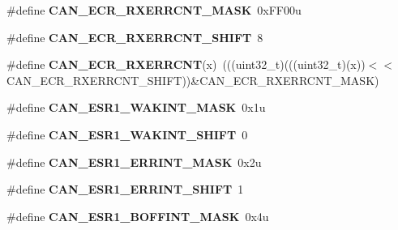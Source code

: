 \begin{DoxyCompactItemize}
\item 
\#define {\bfseries C\+A\+N\+\_\+\+E\+C\+R\+\_\+\+R\+X\+E\+R\+R\+C\+N\+T\+\_\+\+M\+A\+SK}~0x\+F\+F00u\hypertarget{group__CAN__Register__Masks_gaed0f3cf7cea69b12a5166e67ad58b98e}{}\label{group__CAN__Register__Masks_gaed0f3cf7cea69b12a5166e67ad58b98e}

\item 
\#define {\bfseries C\+A\+N\+\_\+\+E\+C\+R\+\_\+\+R\+X\+E\+R\+R\+C\+N\+T\+\_\+\+S\+H\+I\+FT}~8\hypertarget{group__CAN__Register__Masks_ga8211d5f10448105a549f3f4085813922}{}\label{group__CAN__Register__Masks_ga8211d5f10448105a549f3f4085813922}

\item 
\#define {\bfseries C\+A\+N\+\_\+\+E\+C\+R\+\_\+\+R\+X\+E\+R\+R\+C\+NT}(x)~(((uint32\+\_\+t)(((uint32\+\_\+t)(x))$<$$<$C\+A\+N\+\_\+\+E\+C\+R\+\_\+\+R\+X\+E\+R\+R\+C\+N\+T\+\_\+\+S\+H\+I\+FT))\&C\+A\+N\+\_\+\+E\+C\+R\+\_\+\+R\+X\+E\+R\+R\+C\+N\+T\+\_\+\+M\+A\+SK)\hypertarget{group__CAN__Register__Masks_gadbfcb3b6cf61b7a16a75f31d40cab98c}{}\label{group__CAN__Register__Masks_gadbfcb3b6cf61b7a16a75f31d40cab98c}

\item 
\#define {\bfseries C\+A\+N\+\_\+\+E\+S\+R1\+\_\+\+W\+A\+K\+I\+N\+T\+\_\+\+M\+A\+SK}~0x1u\hypertarget{group__CAN__Register__Masks_gaebf477ebf4b3df88922476e9ac121e06}{}\label{group__CAN__Register__Masks_gaebf477ebf4b3df88922476e9ac121e06}

\item 
\#define {\bfseries C\+A\+N\+\_\+\+E\+S\+R1\+\_\+\+W\+A\+K\+I\+N\+T\+\_\+\+S\+H\+I\+FT}~0\hypertarget{group__CAN__Register__Masks_ga146781b97b78d98eb3925860a96cf217}{}\label{group__CAN__Register__Masks_ga146781b97b78d98eb3925860a96cf217}

\item 
\#define {\bfseries C\+A\+N\+\_\+\+E\+S\+R1\+\_\+\+E\+R\+R\+I\+N\+T\+\_\+\+M\+A\+SK}~0x2u\hypertarget{group__CAN__Register__Masks_ga18448e13304efd0d4fe37d26c60c3a05}{}\label{group__CAN__Register__Masks_ga18448e13304efd0d4fe37d26c60c3a05}

\item 
\#define {\bfseries C\+A\+N\+\_\+\+E\+S\+R1\+\_\+\+E\+R\+R\+I\+N\+T\+\_\+\+S\+H\+I\+FT}~1\hypertarget{group__CAN__Register__Masks_gacee94f8f13909a6e02234076eecda564}{}\label{group__CAN__Register__Masks_gacee94f8f13909a6e02234076eecda564}

\item 
\#define {\bfseries C\+A\+N\+\_\+\+E\+S\+R1\+\_\+\+B\+O\+F\+F\+I\+N\+T\+\_\+\+M\+A\+SK}~0x4u\hypertarget{group__CAN__Register__Masks_ga0f997f1d2ad00476745755aa74ce5084}{}\label{group__CAN__Register__Masks_ga0f997f1d2ad00476745755aa74ce5084}


\end{DoxyCompactItemize}
